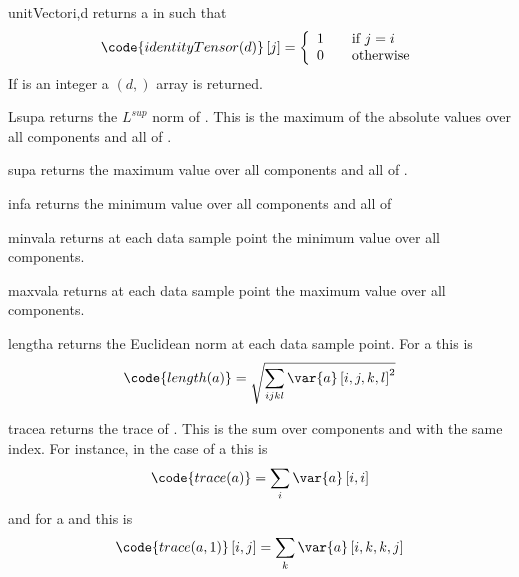 \begin{funcdesc}{unitVector}{i,d}
returns a \RankOne in \FunctionSpace {} such that
\begin{equation}
\code{identityTensor(d)}\left[ j \right] = \left\{
\begin{array}{l l}
    1 & \quad \text{if $j=i$}\\
    0 & \quad \text{otherwise}
\end{array}
\right.
\end{equation}
If  is an integer a $(d,)$ \numpy array is returned.
\end{funcdesc}

\begin{funcdesc}{Lsup}{a}
returns the $L^{sup}$ norm of . This is the maximum of the absolute
values over all components and all \DataSamplePoints of .
\end{funcdesc}

\begin{funcdesc}{sup}{a}
returns the maximum value over all components and all \DataSamplePoints of .
\end{funcdesc}

\begin{funcdesc}{inf}{a}
returns the minimum value over all components and all \DataSamplePoints of 
\end{funcdesc}

\begin{funcdesc}{minval}{a}
returns at each data sample point the minimum value over all components.
\end{funcdesc}

\begin{funcdesc}{maxval}{a}
returns at each data sample point the maximum value over all components.
\end{funcdesc}

\begin{funcdesc}{length}{a}
returns the Euclidean norm at each data sample point.
For a \RankFour {} this is
\begin{equation}
\code{length(a)}=\sqrt{\sum_{ijkl} \var{a} \left[i,j,k,l\right]^2}
\end{equation}
\end{funcdesc}

\begin{funcdesc}{trace}{a}
returns the trace of . This is the sum over components 
and  with the same index.
For instance, in the case of a \RankTwo this is
\begin{equation}
\code{trace(a)}=\sum_{i} \var{a} \left[i,i\right]
\end{equation}
and for a \RankFour and  this is
\begin{equation}
\code{trace(a,1)}\left[i,j\right]=\sum_{k} \var{a} \left[i,k,k,j\right]
\end{equation}
\end{funcdesc}


